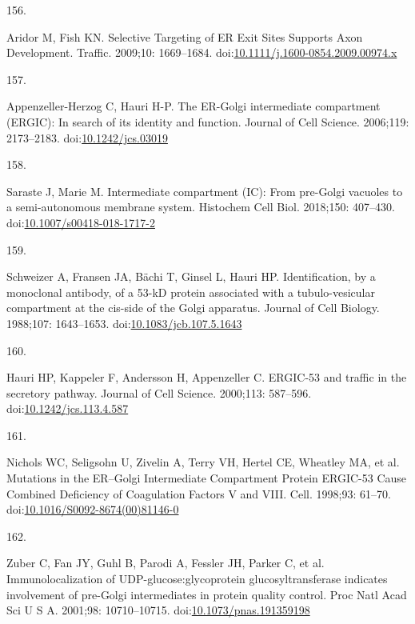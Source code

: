 \documentclass[
  12pt,
  a4paper,
]{book}
\newlength{\cslhangindent}
\newlength{\csllabelwidth}
\newlength{\cslentryspacingunit} %
\newenvironment{CSLReferences}[2] %
 {%
  \setlength{\parindent}{0pt}
  \ifodd #1
  \let\oldpar\par
  \def\par{\hangindent=\cslhangindent\oldpar}
  \fi
  \setlength{\parskip}{#2\cslentryspacingunit}
 }%
 {}
\newcommand{\CSLLeftMargin}[1]{\parbox[t]{\csllabelwidth}{#1}}
\newcommand{\CSLRightInline}[1]{\parbox[t]{\linewidth - \csllabelwidth}{#1}\break}
\begin{document}
\begin{CSLReferences}{0}{0}
\leavevmode{}%
\CSLLeftMargin{156. }%
\CSLRightInline{Aridor M, Fish KN. Selective {Targeting} of {ER Exit Sites Supports Axon Development}. Traffic. 2009;10: 1669--1684. doi:\href{https://doi.org/10.1111/j.1600-0854.2009.00974.x}{10.1111/j.1600-0854.2009.00974.x}}

\leavevmode{}%
\CSLLeftMargin{157. }%
\CSLRightInline{Appenzeller-Herzog C, Hauri H-P. The {ER-Golgi} intermediate compartment ({ERGIC}): In search of its identity and function. Journal of Cell Science. 2006;119: 2173--2183. doi:\href{https://doi.org/10.1242/jcs.03019}{10.1242/jcs.03019}}

\leavevmode{}%
\CSLLeftMargin{158. }%
\CSLRightInline{Saraste J, Marie M. Intermediate compartment ({IC}): From pre-{Golgi} vacuoles to a semi-autonomous membrane system. Histochem Cell Biol. 2018;150: 407--430. doi:\href{https://doi.org/10.1007/s00418-018-1717-2}{10.1007/s00418-018-1717-2}}

\leavevmode{}%
\CSLLeftMargin{159. }%
\CSLRightInline{Schweizer A, Fransen JA, Bächi T, Ginsel L, Hauri HP. Identification, by a monoclonal antibody, of a 53-{kD} protein associated with a tubulo-vesicular compartment at the cis-side of the {Golgi} apparatus. Journal of Cell Biology. 1988;107: 1643--1653. doi:\href{https://doi.org/10.1083/jcb.107.5.1643}{10.1083/jcb.107.5.1643}}

\leavevmode{}%
\CSLLeftMargin{160. }%
\CSLRightInline{Hauri HP, Kappeler F, Andersson H, Appenzeller C. {ERGIC-53} and traffic in the secretory pathway. Journal of Cell Science. 2000;113: 587--596. doi:\href{https://doi.org/10.1242/jcs.113.4.587}{10.1242/jcs.113.4.587}}

\leavevmode{}%
\CSLLeftMargin{161. }%
\CSLRightInline{Nichols WC, Seligsohn U, Zivelin A, Terry VH, Hertel CE, Wheatley MA, et al. Mutations in the {ER}--{Golgi Intermediate Compartment Protein ERGIC-53 Cause Combined Deficiency} of {Coagulation Factors V} and {VIII}. Cell. 1998;93: 61--70. doi:\href{https://doi.org/10.1016/S0092-8674(00)81146-0}{10.1016/S0092-8674(00)81146-0}}

\leavevmode{}%
\CSLLeftMargin{162. }%
\CSLRightInline{Zuber C, Fan JY, Guhl B, Parodi A, Fessler JH, Parker C, et al. Immunolocalization of {UDP-glucose}:glycoprotein glucosyltransferase indicates involvement of pre-{Golgi} intermediates in protein quality control. Proc Natl Acad Sci U S A. 2001;98: 10710--10715. doi:\href{https://doi.org/10.1073/pnas.191359198}{10.1073/pnas.191359198}}


\end{CSLReferences}
\end{document}
